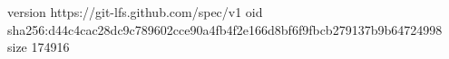 version https://git-lfs.github.com/spec/v1
oid sha256:d44c4cac28dc9c789602cce90a4fb4f2e166d8bf6f9fbcb279137b9b64724998
size 174916
